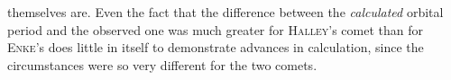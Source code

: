 themselves are. Even the fact that the difference between the \emph{calculated} orbital period and the observed one was much greater for \textsc{Halley}'s comet than for \textsc{Enke}'s does little in itself to demonstrate advances in calculation, since the circumstances were so very different for the two comets.
